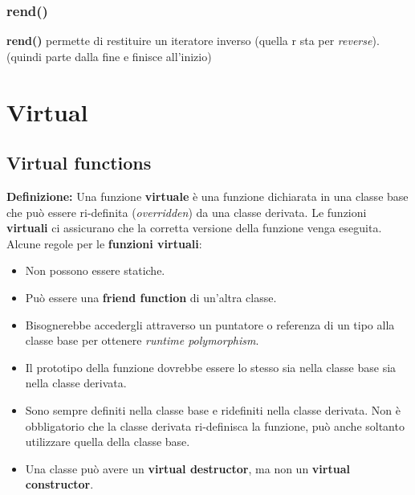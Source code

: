 \subsubsection{rend()}

\textsf{\small \textbf{rend()} permette di restituire un iteratore inverso (quella r sta per \emph{reverse}). (quindi parte dalla fine e finisce all'inizio)} \\


\newpage

\section{Virtual}

\subsection{Virtual functions}

\textsf{\small \textbf{Definizione:} Una funzione \textbf{virtuale} è una funzione dichiarata in una classe base che può essere ri-definita (\emph{overridden}) da una classe derivata. Le funzioni \textbf{virtuali} ci assicurano che la corretta versione della funzione venga eseguita.} \\

\textsf{\small Alcune regole per le \textbf{funzioni virtuali}: }

\begin{itemize}
	\item \textsf{\small Non possono essere statiche.}
	\item \textsf{\small Può essere una \textbf{friend function} di un'altra classe.}
	\item \textsf{\small Bisognerebbe accedergli attraverso un puntatore o referenza di un tipo alla classe base per ottenere \emph{runtime polymorphism}.}
	\item \textsf{\small Il prototipo della funzione dovrebbe essere lo stesso sia nella classe base sia nella classe derivata.}
	\item \textsf{\small Sono sempre definiti nella classe base e ridefiniti nella classe derivata. Non è obbligatorio che la classe derivata ri-definisca la funzione, può anche soltanto utilizzare quella della classe base.}
	\item \textsf{\small Una classe può avere un \textbf{virtual destructor}, ma non un \textbf{virtual constructor}.}
\end{itemize}

